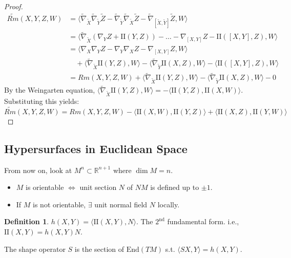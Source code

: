 \documentclass[11pt, a4paper]{article}
\theoremstyle{plain}
\theoremstyle{definition}
\newtheorem{definition}[theorem]{Definition}
\theoremstyle{remark}
\begin{document}
{\begin{proof}
\begin{align*}
\tilde{Rm}(X,Y,Z,W) &= \langle \tilde{\nabla}_{\tilde{X}} \tilde{\nabla}_{\tilde{Y}} \tilde{Z} - \tilde{\nabla}_{\tilde{Y}} \tilde{\nabla}_{\tilde{X}} \tilde{Z} - \tilde{\nabla}_{[\tilde{X}, \tilde{Y}]} \tilde{Z}, W \rangle \\
&= \langle \tilde{\nabla}_{\tilde{X}} (\nabla_Y Z + \mathrm{I\!I}(Y,Z)) - \dots - \nabla_{[X,Y]} Z - \mathrm{I\!I}([X,Y], Z), W \rangle \\
&= \langle \nabla_X \nabla_Y Z - \nabla_Y \nabla_X Z - \nabla_{[X,Y]} Z, W \rangle \\
&\quad + \langle \tilde{\nabla}_{\tilde{X}} \mathrm{I\!I}(Y,Z), W \rangle - \langle \tilde{\nabla}_{\tilde{Y}} \mathrm{I\!I}(X,Z), W \rangle - \langle \mathrm{I\!I}([X,Y], Z), W \rangle \\
&= Rm(X,Y,Z,W) + \langle \tilde{\nabla}_{\tilde{X}} \mathrm{I\!I}(Y,Z), W \rangle - \langle \tilde{\nabla}_{\tilde{Y}} \mathrm{I\!I}(X,Z), W \rangle - 0
\end{align*}
By the Weingarten equation, $\langle \tilde{\nabla}_{\tilde{X}} \mathrm{I\!I}(Y,Z), W \rangle = -\langle \mathrm{I\!I}(Y,Z), \mathrm{I\!I}(X,W) \rangle$.
Substituting this yields:
\[ \tilde{Rm}(X,Y,Z,W) = Rm(X,Y,Z,W) - \langle \mathrm{I\!I}(X,W), \mathrm{I\!I}(Y,Z) \rangle + \langle \mathrm{I\!I}(X,Z), \mathrm{I\!I}(Y,W) \rangle \]
\end{proof}

\subsection{Hypersurfaces in Euclidean Space}

From now on, look at $M^n \subset \mathbb{R}^{n+1}$ where $\dim M = n$.
\begin{itemize}
    \item $M$ is orientable $\Leftrightarrow$ unit section $N$ of $NM$ is defined up to $\pm 1$.
    \item If $M$ is not orientable, $\exists$ unit normal field $N$ locally.
\end{itemize}

\begin{definition}
$h(X,Y) = \langle \mathrm{I\!I}(X,Y), N \rangle$. The $2^{\text{nd}}$ fundamental form. i.e., $\mathrm{I\!I}(X,Y) = h(X,Y)N$.
\end{definition}

The shape operator $S$ is the section of $\mathrm{End}(TM)$ s.t. $\langle SX, Y \rangle = h(X,Y)$.

}
\end{document}
